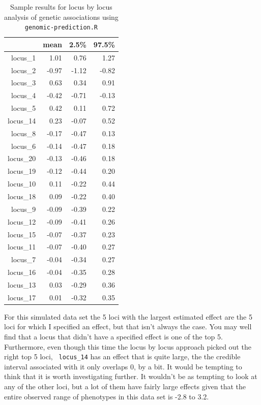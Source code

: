 \documentclass[12pt]{article}
\begin{document}
\begin{table}[ht]
\centering
\begin{tabular}{rrrr}
  \hline
 & mean & 2.5\% & 97.5\% \\ 
  \hline
locus\_1 & 1.01 & 0.76 & 1.27 \\ 
  locus\_2 & -0.97 & -1.12 & -0.82 \\ 
  locus\_3 & 0.63 & 0.34 & 0.91 \\ 
  locus\_4 & -0.42 & -0.71 & -0.13 \\ 
  locus\_5 & 0.42 & 0.11 & 0.72 \\ 
  locus\_14 & 0.23 & -0.07 & 0.52 \\ 
  locus\_8 & -0.17 & -0.47 & 0.13 \\ 
  locus\_6 & -0.14 & -0.47 & 0.18 \\ 
  locus\_20 & -0.13 & -0.46 & 0.18 \\ 
  locus\_19 & -0.12 & -0.44 & 0.20 \\ 
  locus\_10 & 0.11 & -0.22 & 0.44 \\ 
  locus\_18 & 0.09 & -0.22 & 0.40 \\ 
  locus\_9 & -0.09 & -0.39 & 0.22 \\ 
  locus\_12 & -0.09 & -0.41 & 0.26 \\ 
  locus\_15 & -0.07 & -0.37 & 0.23 \\ 
  locus\_11 & -0.07 & -0.40 & 0.27 \\ 
  locus\_7 & -0.04 & -0.34 & 0.27 \\ 
  locus\_16 & -0.04 & -0.35 & 0.28 \\ 
  locus\_13 & 0.03 & -0.29 & 0.36 \\ 
  locus\_17 & 0.01 & -0.32 & 0.35 \\ 
   \hline
\end{tabular}
\caption{Sample results for locus by locus analysis of genetic
  associations using {\tt genomic-prediction.R}}\label{table:single}
\end{table}

For this simulated data set the 5 loci with the largest estimated
effect are the 5 loci for which I specified an effect, but that isn't
always the case. You may well find that a locus that didn't have a
specified effect is one of the top 5. Furthermore, even though this
time the locus by locus approach picked out the right top 5 loci, {\tt
  locus\_14} has an effect that is quite large, the the credible
interval associated with it only overlaps 0, by a bit. It would be
tempting to think that it is worth investigating further. It wouldn't
be as tempting to look at any of the other loci, but a lot of them
have fairly large effects given that the entire observed range of
phenotypes in this data set is -2.8 to 3.2.
\end{document}
